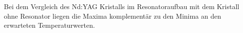 \documentclass[../main.tex]{subfiles}
\begin{document}
    Bei dem Vergleich des Nd:YAG Kristalls im Resonatoraufbau mit dem Kristall ohne Resonator liegen die Maxima komplementär zu den Minima an den erwarteten Temperaturwerten. 
\end{document}
